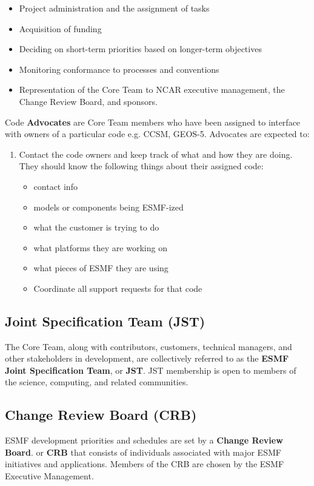 \begin{itemize}
\item Project administration and the assignment of  tasks
\item Acquisition of funding
\item Deciding on short-term priorities based on longer-term objectives
\item Monitoring conformance to processes and conventions
\item Representation of the Core Team to NCAR executive management, the Change Review 
Board, and sponsors.
\end{itemize}

Code {\bf Advocates} are Core Team members who have been assigned to interface with owners of
a particular code e.g. CCSM, GEOS-5. Advocates are expected to:
\begin{enumerate}
\item Contact the code owners and keep track of what and how they are doing. They should know
the following things about their assigned code:

\begin{itemize}
\item contact info
\item models or components being ESMF-ized
\item what the customer is trying to do
\item what platforms they are working on
\item what pieces of ESMF they are using
\item Coordinate all support requests for that code
\end{itemize}

\end{enumerate}

\subsection{Joint Specification Team (JST)}
The Core Team, along with contributors, customers, technical
managers, and other stakeholders in development, are collectively
referred to as the {\bf ESMF Joint Specification Team}, or {\bf JST}.  
JST membership is open to members of the science, computing, and
related communities.

\subsection{Change Review Board (CRB)}
ESMF development priorities and schedules are set by a 
{\bf Change Review Board}. or {\bf CRB} that consists of individuals
associated with major ESMF initiatives and applications.  
Members of the CRB are chosen by the ESMF Executive Management.


